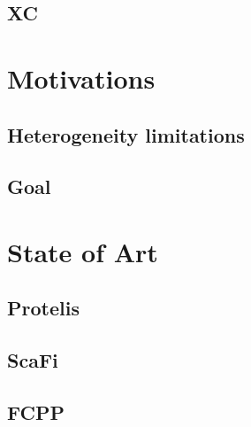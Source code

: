 \subsection{XC}
\label{subsec:xc}


\section{Motivations}
\label{sec:motivations}


\subsection{Heterogeneity limitations}
\label{subsec:heterogeneity-limitations}

\subsection{Goal}
\label{subsec:goal}


\section{State of Art}
\label{sec:state-of-art}

\subsection{Protelis}
\label{subsec:protelis}

\subsection{ScaFi}
\label{subsec:scafi}

\subsection{FCPP}
\label{subsec:fcpp}


%
%
%
%
%
